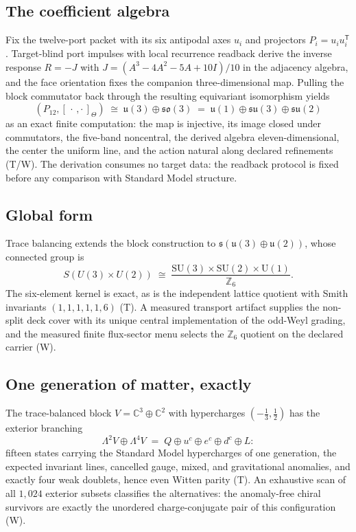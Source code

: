 \documentclass[11pt]{article}
\theoremstyle{remark}
\newcommand{\evT}{\textsf{T}}   %
\newcommand{\evW}{\textsf{W}}   %
\begin{document}
\subsection{The coefficient algebra}

Fix the twelve-port packet with its six antipodal axes $u_i$ and projectors
$P_i=u_iu_i^{\mathsf T}$. Target-blind port impulses with local recurrence
readback derive the inverse response $R=-J$ with
$J=(A^{3}-4A^{2}-5A+10I)/10$ in the adjacency algebra, and the face
orientation fixes the companion three-dimensional map. Pulling the block
commutator back through the resulting equivariant isomorphism yields
\begin{equation}
(P_{12},[\,\cdot\,,\cdot\,]_{\Theta})\;\cong\;
\mathfrak u(3)\oplus\mathfrak{so}(3)\;=\;
\mathfrak u(1)\oplus\mathfrak{su}(3)\oplus\mathfrak{su}(2)
\label{eq:liealgebra}
\end{equation}
as an exact finite computation: the map is injective, its image closed under
commutators, the five-band noncentral, the derived algebra
eleven-dimensional, the center the uniform line, and the action natural
along declared refinements (\evT/\evW). The derivation consumes no target
data: the readback protocol is fixed before any comparison with Standard
Model structure.

\subsection{Global form}

Trace balancing extends the block construction to
$\mathfrak s(\mathfrak u(3)\oplus\mathfrak u(2))$, whose connected group is
\begin{equation}
S(U(3)\times U(2))\;\cong\;
\frac{\mathrm{SU}(3)\times\mathrm{SU}(2)\times\mathrm U(1)}{\mathbb Z_{6}} .
\label{eq:globalform}
\end{equation}
The six-element kernel is exact, as is the independent lattice quotient with
Smith invariants $(1,1,1,1,1,6)$ (\evT). A measured transport artifact
supplies the non-split deck cover with its unique central implementation of
the odd-Weyl grading, and the measured finite flux-sector menu selects the
$\mathbb Z_{6}$ quotient on the declared carrier (\evW).

\subsection{One generation of matter, exactly}

The trace-balanced block $V=\mathbb C^{3}\oplus\mathbb C^{2}$ with
hypercharges $(-\tfrac13,\tfrac12)$ has the exterior branching
\begin{equation}
\Lambda^{2}V\oplus\Lambda^{4}V
\;=\;Q\oplus u^{c}\oplus e^{c}\oplus d^{c}\oplus L :
\label{eq:generation}
\end{equation}
fifteen states carrying the Standard Model hypercharges of one generation,
the expected invariant lines, cancelled gauge, mixed, and gravitational
anomalies, and exactly four weak doublets, hence even Witten parity
(\evT). An exhaustive scan of all $1{,}024$ exterior subsets classifies the
alternatives: the anomaly-free chiral survivors are exactly the unordered
charge-conjugate pair of this configuration (\evW).
\end{document}
